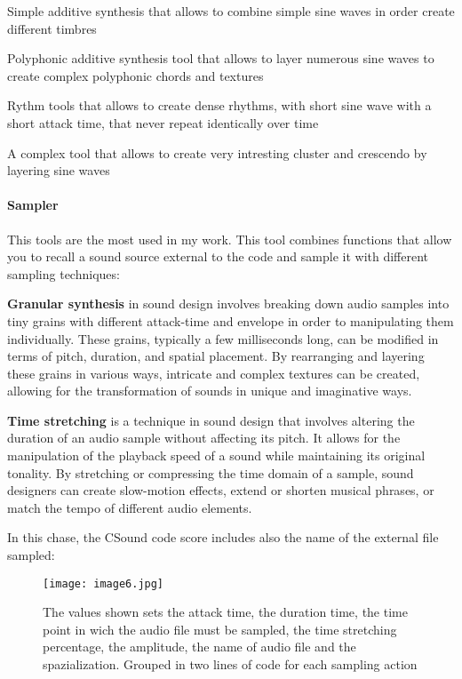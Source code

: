 		\begin{compactitem}
			\item Simple additive synthesis that allows to combine simple sine waves in order create different timbres
			\item Polyphonic additive synthesis tool that allows to layer numerous sine waves to create complex polyphonic chords and textures
			\item Rythm tools that allows to create dense rhythms, with short sine wave with a short attack time, that never repeat identically over time
			\item A complex tool that allows to create very intresting cluster and crescendo by layering sine waves
		\end{compactitem}
		
		\paragraph{Sampler} This tools are the most used in my work.
		This tool combines functions that allow you to recall a sound source external to the code and sample it with different sampling techniques:
		
			\begin{compactitem}
				\item \textbf{Granular synthesis} in sound design involves breaking down audio samples into tiny grains with different attack-time and envelope in order to manipulating them individually. These grains, typically a few milliseconds long, can be modified in terms of pitch, duration, and spatial placement. By rearranging and layering these grains in various ways, intricate and complex textures can be created, allowing for the transformation of sounds in unique and imaginative ways.
				\item \textbf{Time stretching} is a technique in sound design that involves altering the duration of an audio sample without affecting its pitch. It allows for the manipulation of the playback speed of a sound while maintaining its original tonality. By stretching or compressing the time domain of a sample, sound designers can create slow-motion effects, extend or shorten musical phrases, or match the tempo of different audio elements.
			\end{compactitem}
		
		In this chase, the CSound code score includes also the name of the external file sampled:
		
			\begin{figure}[h]
				\begin{center}
					\texttt{[image: image6.jpg]}
					\caption{The values shown sets the attack time, the duration time, the time point in wich the audio file must be sampled, the time stretching percentage, the amplitude, the name of audio file and the spazialization. Grouped in two lines of code for each sampling action}
				\end{center}
			\end{figure}
		

